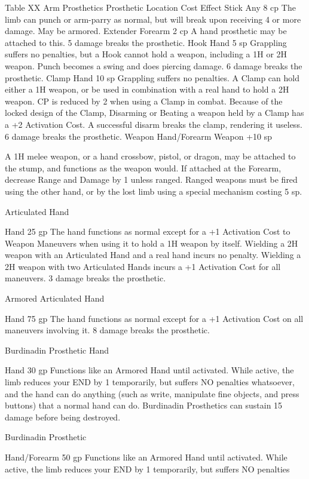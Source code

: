 \documentclass[oneside,11pt,english]{book}
\begin{document}
Table XX Arm Prosthetics 
Prosthetic Location Cost Effect 
Stick Any 8 cp The limb can punch or arm-parry as normal, but will break upon 
receiving 4 or more damage. May be armored. 
Extender Forearm 2 cp A hand prosthetic may be attached to this. 5 damage breaks the 
prosthetic. 
Hook Hand 5 sp Grappling suffers no penalties, but a Hook cannot hold a weapon, 
including a 1H or 2H weapon. Punch becomes a swing and does 
piercing damage. 6 damage breaks the prosthetic. 
Clamp Hand 10 sp Grappling suffers no penalties. A Clamp can hold either a 1H weapon, 
or be used in combination with a real hand to hold a 2H weapon. CP 
is reduced by 2 when using a Clamp in combat. 
Because of the locked design of the Clamp, Disarming or Beating a 
weapon held by a Clamp has a +2 Activation Cost. 
A successful disarm breaks the clamp, rendering it useless. 6 damage 
breaks the prosthetic. 
Weapon Hand/Forearm Weapon 
+10 sp 

A 1H melee weapon, or a hand crossbow, pistol, or dragon, may be 
attached to the stump, and functions as the weapon would. If attached 
at the Forearm, decrease Range and Damage by 1 unless ranged. 
Ranged weapons must be fired using the other hand, or by the lost 
limb using a special mechanism costing 5 sp. 

Articulated 
Hand 

Hand 25 gp The hand functions as normal except for a +1 Activation Cost to 
Weapon Maneuvers when using it to hold a 1H weapon by itself. 
Wielding a 2H weapon with an Articulated Hand and a real hand 
incurs no penalty. Wielding a 2H weapon with two Articulated Hands 
incurs a +1 Activation Cost for all maneuvers. 3 damage breaks the 
prosthetic. 

Armored 
Articulated 
Hand 

Hand 75 gp The hand functions as normal except for a +1 Activation Cost on all 
maneuvers involving it. 8 damage breaks the prosthetic. 

Burdinadin 
Prosthetic 
Hand 

Hand 30 gp Functions like an Armored Hand until activated. While active, the 
limb reduces your END by 1 temporarily, but suffers NO penalties 
whatsoever, and the hand can do anything (such as write, manipulate 
fine objects, and press buttons) that a normal hand can do. Burdinadin 
Prosthetics can sustain 15 damage before being destroyed. 

Burdinadin 
Prosthetic 

Hand/Forearm 50 gp Functions like an Armored Hand until activated. While active, the 
limb reduces your END by 1 temporarily, but suffers NO penalties 
\end{document}
